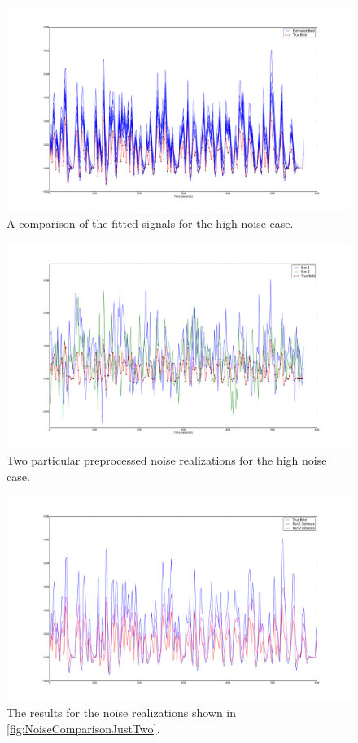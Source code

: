 \begin{figure}
\includegraphics[clip=true,trim=6cm 2cm 6cm 3.5cm,width=17cm]{images/comparison_highnoise}
\caption{A comparison of the fitted signals for the high noise case.}
\label{fig:FitComparisonHighNoise}
\end{figure}
\begin{figure}
\includegraphics[clip=true,trim=6cm 2cm 6cm 3.5cm,width=17cm]{images/highnoise_56_noise}
\caption{Two particular preprocessed noise realizations for the high noise case.}
\label{fig:NoiseComparisonJustTwo}
\end{figure}

\begin{figure}
\includegraphics[clip=true,trim=6cm 2cm 6cm 3.5cm,width=17cm]{images/comparison_highnoise_just2}
\caption{The results for the noise realizations shown in \autoref{fig:NoiseComparisonJustTwo}.}
\label{fig:FitComparisonHighNoiseJust2}
\end{figure}

